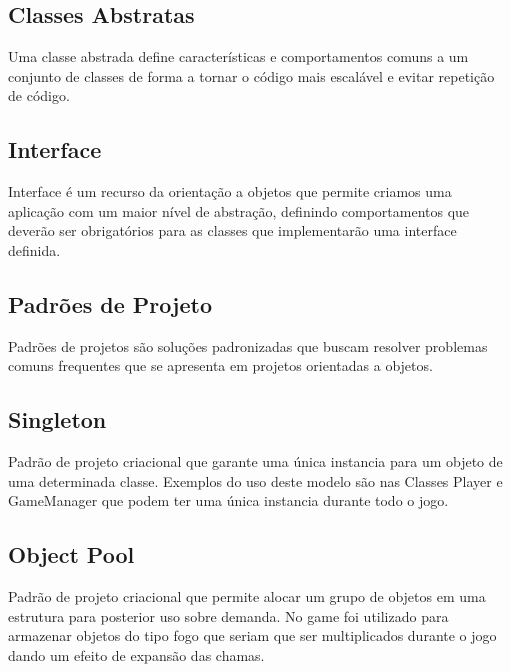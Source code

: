 \subsection{Classes Abstratas}	
Uma classe abstrada define características e comportamentos comuns a um conjunto de classes de forma a tornar o código mais escalável e evitar repetição de código.

\subsection{Interface}	
Interface é um recurso da orientação a objetos que permite criamos uma aplicação com um maior nível de abstração, definindo comportamentos que deverão ser obrigatórios para as classes que implementarão uma interface definida.


\subsection{Padrões de Projeto}	
Padrões de projetos são soluções padronizadas que buscam resolver problemas comuns frequentes que se apresenta em projetos orientadas a objetos.


\subsection{Singleton}	
Padrão de projeto criacional que garante uma única instancia para um objeto de uma determinada classe. Exemplos do uso deste modelo são nas Classes Player e GameManager que podem ter uma única instancia durante todo o jogo.


\subsection{Object Pool}	
Padrão de projeto criacional que permite alocar um grupo de objetos em uma estrutura para posterior uso sobre demanda. No game foi utilizado para armazenar objetos do tipo fogo que seriam que ser multiplicados durante o jogo dando um efeito de expansão das chamas.